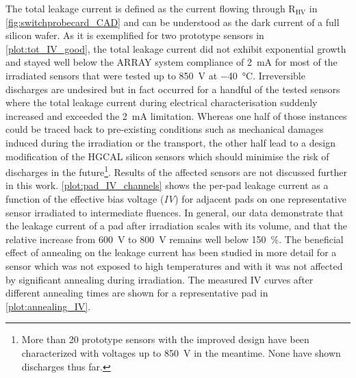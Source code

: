 The total leakage current is defined as the current flowing through R$_\text{HV}$ in \ref{fig:switchprobecard_CAD} and can be understood as the dark current of a full silicon wafer.
As it is exemplified for two prototype sensors in \ref{plot:tot_IV_good}, the total leakage current did not exhibit exponential growth and stayed well below the ARRAY system compliance of \SI{2}{\milli\ampere} for most of the irradiated sensors that were tested up to \SI{850}{\volt} at \SI{-40}{\celsius}.
Irreversible discharges are undesired but in fact occurred for a handful of the tested sensors where the total leakage current during electrical characterisation suddenly increased and exceeded the \SI{2}{\milli\ampere} limitation.
Whereas one half of those instances could be traced back to pre-existing conditions such as mechanical damages induced during the irradiation or the transport, the other half lead to a design modification of the HGCAL silicon sensors which should minimise the risk of discharges in the future\footnote{More than 20 prototype sensors with the improved design have been characterized with voltages up to \SI{850}{\volt} in the meantime. None have shown discharges thus far.}.
Results of the affected sensors are not discussed further in this work.
\ref{plot:pad_IV_channels} shows the per-pad leakage current as a function of the effective bias voltage (\emph{IV}) for adjacent pads on one representative sensor irradiated to intermediate fluences.
In general, our data demonstrate that the leakage current of a pad after irradiation scales with its volume, and that the relative increase from \SI{600}{\volt} to \SI{800}{\volt} remains well below \SI{150}{\percent}.
The beneficial effect of annealing on the leakage current has been studied in more detail for a sensor which was not exposed to high temperatures and with it was not affected by significant annealing during irradiation.
The measured IV curves after different annealing times are shown for a representative pad in \ref{plot:annealing_IV}.
